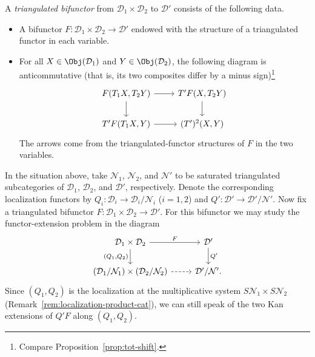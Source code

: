 \begin{definition}\label{def:triangulated-bifunctor}
	A \emph{triangulated bifunctor} from
	$\mathcal{D}_1\times\mathcal{D}_2$ to $\mathcal{D}'$ consists of the
	following data.
	\begin{itemize}
		\item A bifunctor $F:\mathcal{D}_1\times\mathcal{D}_2\to\mathcal{D}'$
		endowed with the structure of a triangulated functor in each variable.
		\item For all $X\in\Obj(\mathcal{D}_1)$ and
		$Y\in\Obj(\mathcal{D}_2)$, the following diagram is anticommutative
		(that is, its two composites differ by a minus sign)\footnote{Compare
		Proposition~\ref{prop:tot-shift}.}
		\[\begin{tikzcd}
			F(T_1 X, T_2 Y) \arrow[r] \arrow[d] & T' F(X, T_2 Y) \arrow[d] \\
			T' F(T_1 X, Y) \arrow[r] & (T')^2(X, Y)
		\end{tikzcd}\]
		The arrows come from the triangulated-functor structures of $F$ in the
		two variables.
	\end{itemize}
\end{definition}

In the situation above, take $\mathcal{N}_1$, $\mathcal{N}_2$, and
$\mathcal{N}'$ to be saturated triangulated subcategories of
$\mathcal{D}_1$, $\mathcal{D}_2$, and $\mathcal{D}'$, respectively. Denote
the corresponding localization functors by
$Q_i:\mathcal{D}_i\to\mathcal{D}_i/\mathcal{N}_i$ ($i=1,2$) and
$Q':\mathcal{D}'\to\mathcal{D}'/\mathcal{N}'$. Now fix a triangulated
bifunctor $F:\mathcal{D}_1\times\mathcal{D}_2\to\mathcal{D}'$. For this
bifunctor we may study the functor-extension problem in the diagram
\[\begin{tikzcd}
	\mathcal{D}_1 \times \mathcal{D}_2 \arrow[d, "{(Q_1, Q_2)}"'] \arrow[r, "F"] & \mathcal{D}' \arrow[d, "{Q'}"] \\
	(\mathcal{D}_1 / \mathcal{N}_1) \times (\mathcal{D}_2 / \mathcal{N}_2) \arrow[r, dashed] & \mathcal{D}'/\mathcal{N}' .
\end{tikzcd}\]
Since $(Q_1,Q_2)$ is the localization at the multiplicative system
$S\mathcal{N}_1\times S\mathcal{N}_2$
(Remark~\ref{rem:localization-product-cat}), we can still speak of the two Kan
extensions of $Q'F$ along $(Q_1,Q_2)$.


